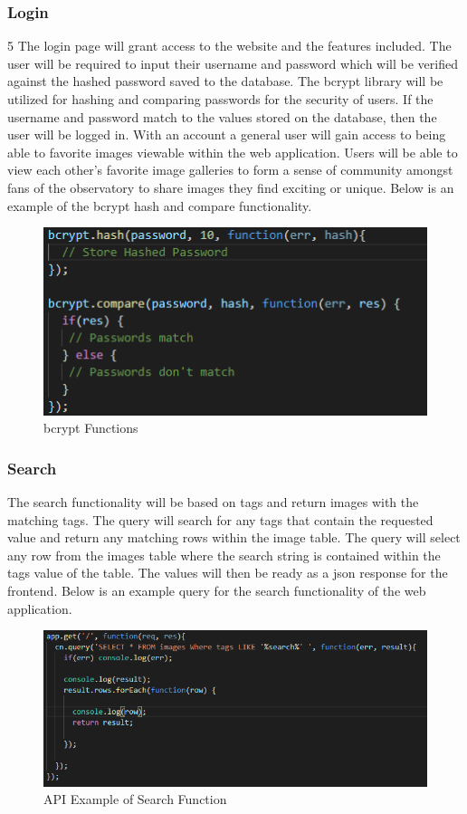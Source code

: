 \documentclass[12pt]{report}
\begin{document}
\subsubsection*{Login}
5
The login page will grant access to the website and the features included.  The user will be required to input their username and password which will be verified against the hashed password saved to the database.  The bcrypt library will be utilized for hashing and comparing passwords for the security of users.  If the username and password match to the values stored on the database, then the user will be logged in.  With an account a general user will gain access to being able to favorite images viewable within the web application.  Users will be able to view each other’s favorite image galleries to form a sense of community amongst fans of the observatory to share images they find exciting or unique.  Below is an example of the bcrypt hash and compare functionality.

\begin{figure}[h]
	\centering
	\includegraphics[scale=0.5]{api_bcrypt}
	\caption{bcrypt Functions}
	\label{fig:API bcrypt}
\end{figure}

\subsubsection*{Search}

The search functionality will be based on tags and return images with the matching tags.  The query will search for any tags that contain the requested value and return any matching rows within the image table.  The query will select any row from the images table where the search string is contained within the tags value of the table.  The values will then be ready as a json response for the frontend.  Below is an example query for the search functionality of the web application.

\begin{figure}[h]
	\centering
	\includegraphics[scale=0.5]{api_search}
	\caption{API Example of Search Function}
	\label{fig:API Search}
\end{figure}
\end{document}
